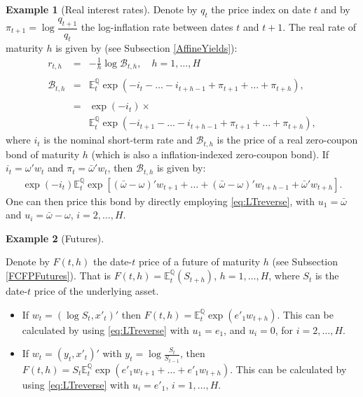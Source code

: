 \documentclass[
  12pt,
]{book}
\theoremstyle{definition}
\theoremstyle{definition}
\newtheorem{example}{Example}[chapter]
\theoremstyle{definition}
\theoremstyle{definition}
\theoremstyle{remark}
\begin{document}
\begin{example}[Real interest rates]
\protect\hypertarget{exm:realBth}{}\label{exm:realBth}Denote by \(q_t\) the price index on date \(t\) and by \(\pi_{t+1} = \log \dfrac{q_{t+1}}{q_t}\) the log-inflation rate between dates \(t\) and \(t+1\). The real rate of maturity \(h\) is given by (see Subsection \ref{AffineYields}):
\begin{eqnarray*}
r_{t,h} & =& -   \frac{1}{h}   \log   \mathcal{B}_{t,h}, \quad h=1,\dots,H \\    \\
\mathcal{B}_{t,h} & =&  \mathbb{E}^{\mathbb{Q}}_t   \exp(-i_{t}-\dots-i_{t+h-1} + \pi_{t+1}+\dots+\pi_{t+h}),  \\      \\
& =& \exp(-i_{t}) \times \\
&& \mathbb{E}^{\mathbb{Q}}_t \exp(-i_{t+1}-\dots-i_{t+h-1}+\pi_{t+1}+\dots+\pi_{t+h}),
\end{eqnarray*}
where \(i_t\) is the nominal short-term rate and \(\mathcal{B}_{t,h}\) is the price of a real zero-coupon bond of maturity \(h\) (which is also a inflation-indexed zero-coupon bond).
If \(i_t = \omega'w_t\) and \(\pi_t = \bar\omega'w_t\), then \(\mathcal{B}_{t,h}\) is given by:
\begin{eqnarray*}
\exp(-i_{t}) \mathbb{E}^{\mathbb{Q}}_t \exp[(\bar\omega-\omega)'w_{t+1}+\dots+(\bar\omega-\omega)'w_{t+h-1}+\bar\omega'
w_{t+h}].
\end{eqnarray*}
One can then price this bond by directly employing \eqref{eq:LTreverse}, with \(u_1 = \bar\omega\) and \(u_i = \bar\omega-\omega\), \(i = 2,\dots, H\).
\end{example}

\begin{example}[Futures]
\protect\hypertarget{exm:Futures}{}\label{exm:Futures}

Denote by \(F(t,h)\) the date-\(t\) price of a future of maturity \(h\) (see Subsection \ref{FCFPFutures}). That is \(F(t,h) = \mathbb{E}^{\mathbb{Q}}_t (S_{t+h})\), \(h=1,\dots,H\), where \(S_t\) is the date-\(t\) price of the underlying asset.

\begin{itemize}
\item
  If \(w_t = (\log S_t, x'_t)'\) then \(F(t,h) = \mathbb{E}^{\mathbb{Q}}_t \exp(e'_1 w_{t+h})\). This can be calculated by using \eqref{eq:LTreverse} with \(u_1 = e_1\), and \(u_i = 0\), for \(i=2,\dots,H\).
\item
  If \(w_t = (y_t, x'_t)'\) with \(y_t = \log\frac{S_t}{S_{t-1}}\), then \(F(t,h) = S_t \mathbb{E}^{\mathbb{Q}}_t \exp(e'_1 w_{t+1}+\dots+e'_1 w_{t+h})\). This can be calculated by using \eqref{eq:LTreverse} with \(u_i = e'_1\), \(i=1,\dots,H\).
\end{itemize}

\end{example}
\end{document}
